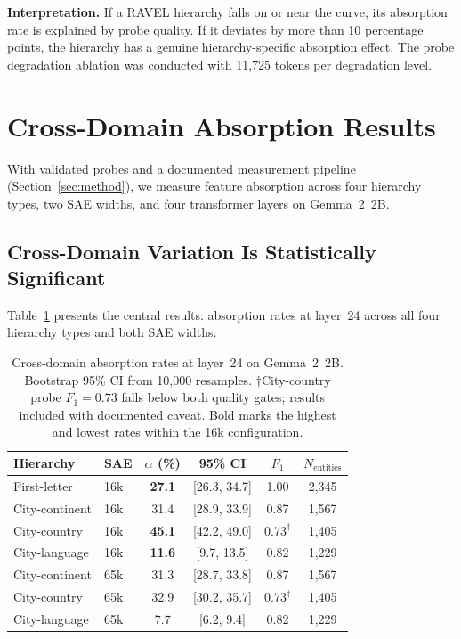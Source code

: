 \documentclass{article}
\begin{document}
\textbf{Interpretation.} If a RAVEL hierarchy falls on or near the curve, its absorption rate is explained by probe quality. If it deviates by more than 10 percentage points, the hierarchy has a genuine hierarchy-specific absorption effect. The probe degradation ablation was conducted with 11,725 tokens per degradation level.

\section{Cross-Domain Absorption Results}
\label{sec:results}

With validated probes and a documented measurement pipeline (Section~\ref{sec:method}), we measure feature absorption across four hierarchy types, two SAE widths, and four transformer layers on Gemma~2~2B.

\subsection{Cross-Domain Variation Is Statistically Significant}

Table~\ref{tab:crossdomain} presents the central results: absorption rates at layer~24 across all four hierarchy types and both SAE widths.

\begin{table}[t]
\caption{Cross-domain absorption rates at layer~24 on Gemma~2~2B. Bootstrap 95\% CI from 10,000 resamples. $\dagger$City-country probe $F_1 = 0.73$ falls below both quality gates; results included with documented caveat. Bold marks the highest and lowest rates within the 16k configuration.}
\label{tab:crossdomain}
\centering
\begin{tabular}{llcccc}
\toprule
Hierarchy & SAE & $\alpha$ (\%) & 95\% CI & $F_1$ & $N_{\text{entities}}$ \\
\midrule
First-letter    & 16k & \textbf{27.1} & [26.3, 34.7] & 1.00 & 2,345 \\
City-continent  & 16k & 31.4          & [28.9, 33.9] & 0.87 & 1,567 \\
City-country    & 16k & \textbf{45.1} & [42.2, 49.0] & $0.73^\dagger$ & 1,405 \\
City-language   & 16k & \textbf{11.6} & [9.7, 13.5]  & 0.82 & 1,229 \\
\midrule
City-continent  & 65k & 31.3          & [28.7, 33.8] & 0.87 & 1,567 \\
City-country    & 65k & 32.9          & [30.2, 35.7] & $0.73^\dagger$ & 1,405 \\
City-language   & 65k & 7.7           & [6.2, 9.4]   & 0.82 & 1,229 \\
\bottomrule
\end{tabular}
\end{table}
\end{document}
